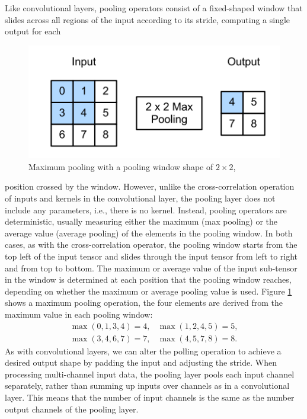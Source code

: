 \documentclass[12pt]{report}
\numberwithin{equation}{section}
\begin{document}
Like convolutional layers, pooling operators consist of a fixed-shaped window that slides across all regions of the input according to its stride, computing a single output for each 
\begin{figure}[H]
\centering
\includegraphics[scale=0.9]{png/pooling.png}
\caption[Maximum pooling with a pooling window shape of $2 \times 2$]{Maximum pooling with a pooling window shape of $2 \times 2$, {\cite{zhang2020dive}}}
\label{fig:pool}
\end{figure} \noindent
position crossed by the window. However, unlike the cross-correlation operation of inputs and kernels in the convolutional layer, the pooling layer does not include any parameters, i.e., there is no kernel. Instead, pooling operators are deterministic, usually measuring either the maximum (max pooling) or the average value (average pooling) of the elements in the pooling window. In both cases, as with the cross-correlation operator, the pooling window starts from the top left of the input tensor and slides through the input tensor from left to right and from top to bottom. The maximum or average value of the input sub-tensor in the window is determined at each position that the pooling window reaches, depending on whether the maximum or average pooling value is used. Figure \ref{fig:pool} shows a maximum pooling operation, the four elements are derived from the maximum value in each pooling window:
\begin{equation}
\begin{array}{ll}
\max (0,1,3,4)=4, & \max (1,2,4,5)=5, \\
\max (3,4,6,7)=7, & \max (4,5,7,8)=8. 
\end{array}
\end{equation} \noindent
As with convolutional layers, we can alter the polling operation to achieve a desired output shape by padding the input and adjusting the stride. When processing multi-channel input data, the pooling layer pools each input channel separately, rather than summing up inputs over channels as in a convolutional layer. This means that the number of input channels is the same as the number output channels of the pooling layer.
\end{document}
